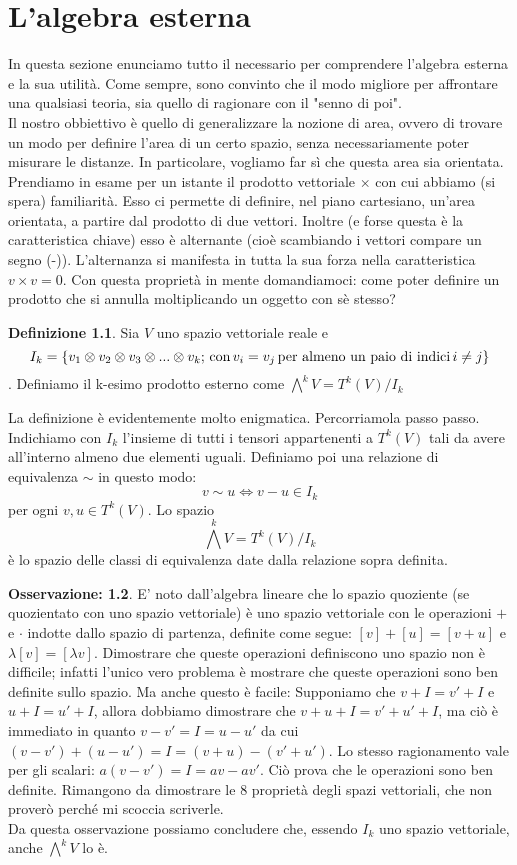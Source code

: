\documentclass[12pt,a4paper]{report}
\theoremstyle{definition}
\newtheorem{Def}{Definizione}[chapter]
\theoremstyle{Theorem}
\theoremstyle{definition}
\theoremstyle{definition}
\theoremstyle{definition}
\newtheorem{Obs}[Def]{Osservazione:}
\begin{document}
	\chapter{L'algebra esterna}
	In questa sezione enunciamo tutto il necessario per comprendere l'algebra esterna e la sua utilità. Come sempre, sono convinto che il modo migliore per affrontare una qualsiasi teoria, sia quello di ragionare con il "senno di poi".\\
	Il nostro obbiettivo è quello di generalizzare la nozione di area, ovvero di trovare un modo per definire l'area di un certo spazio, senza necessariamente poter misurare le distanze. In particolare, vogliamo far sì che questa area sia orientata. Prendiamo in esame per un istante il prodotto vettoriale $\times$ con cui abbiamo (si spera) familiarità. Esso ci permette di definire, nel piano cartesiano, un'area orientata, a partire dal prodotto di due vettori. Inoltre (e forse questa è la caratteristica chiave) esso è alternante (cioè scambiando i vettori compare un segno (-)). L'alternanza si manifesta in tutta la sua forza nella caratteristica $v\times v=0$. Con questa proprietà in mente domandiamoci: come poter definire un prodotto che si annulla moltiplicando un oggetto con sè stesso?
	\begin{Def}
		Sia $V$ uno spazio vettoriale reale e $$I_k=\{v_1\otimes v_2\otimes v_3\otimes...\otimes v_k; \, \hbox{con} \, v_i=v_j \, \hbox{per almeno un paio di indici} \, i\neq j \}$$. Definiamo il k-esimo prodotto esterno come $\bigwedge^kV=T^k(V)/I_k$
	\end{Def}
La definizione è evidentemente molto enigmatica. Percorriamola passo passo. Indichiamo con $I_k$ l'insieme di tutti i tensori appartenenti a $T^k(V)$ tali da avere all'interno almeno due elementi uguali. Definiamo poi una relazione di equivalenza $\sim$ in questo modo:
$$v\sim u\Longleftrightarrow v-u\in I_k$$ per ogni $v,u\in T^k(V)$.
Lo spazio $$\bigwedge^kV=T^k(V)/I_k$$ è lo spazio delle classi di equivalenza date dalla relazione sopra definita. 
\begin{Obs}
	E' noto dall'algebra lineare che lo spazio quoziente (se quozientato con uno spazio vettoriale) è uno spazio vettoriale con le operazioni $+$ e $\cdot$ indotte dallo spazio di partenza, definite come segue: $[v]+[u]=[v+u]$ e $\lambda[v]=[\lambda v]$. Dimostrare che queste operazioni definiscono uno spazio non è difficile; infatti l'unico vero problema è mostrare che queste operazioni sono ben definite sullo spazio. Ma anche questo è facile:
	Supponiamo che $v+I=v'+I$ e $u+I=u'+I$, allora dobbiamo dimostrare che $v+u+I=v'+u'+I$, ma ciò è immediato in quanto $v-v'=I=u-u'$ da cui $(v-v')+(u-u')=I=(v+u)-(v'+u')$. Lo stesso ragionamento vale per gli scalari: $a(v-v')=I=av-av'$. Ciò prova che le operazioni sono ben definite. Rimangono da dimostrare le 8 proprietà degli spazi vettoriali, che non proverò perché mi scoccia scriverle.\\
	Da questa osservazione possiamo concludere che, essendo $I_k$ uno spazio vettoriale, anche $\bigwedge^kV$ lo è.
\end{Obs}
\end{document}
